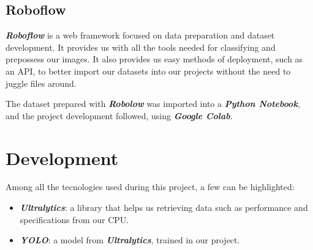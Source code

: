 \documentclass[conference]{IEEEtran}
\begin{document}
\subsection{Roboflow}

\textit{\textbf{Roboflow}} is a web framework focused on data preparation and dataset development. It provides us with all the tools needed for classifying and prepossess our images. It also provides us easy methods of deployment, such as an API, to better import our datasets into our projects without the need to juggle files around.

The dataset prepared with \textit{\textbf{Robolow}} was imported into a \textit{\textbf{Python Notebook}}, and the project development followed, using \textit{\textbf{Google Colab}}.

\section{Development}

Among all the tecnologies used during this project, a few can be highlighted:

\begin{itemize}
    \item \textit{\textbf{Ultralytics}}: a library that helps us retrieving data such as performance and specifications from our CPU.
    \item \textit{\textbf{YOLO}}: a model from \textit{\textbf{Ultralytics}}, trained in our project.
\end{itemize}
\end{document}
